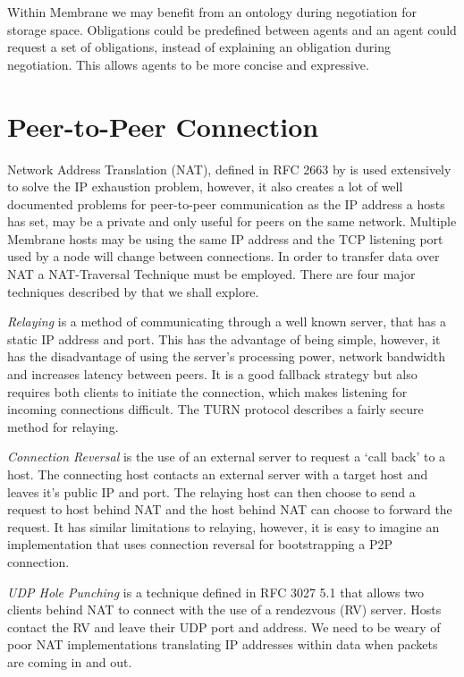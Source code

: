 \documentclass[11pt, a4paper, twocolumn, twoside]{report}
\begin{document}
Within Membrane we may benefit from an ontology during negotiation for storage space. Obligations could be predefined between agents and an agent could request a set of obligations, instead of explaining an obligation during negotiation. This allows agents to be more concise and expressive.

\section{Peer-to-Peer Connection} \label{sec:p2pconn}

Network Address Translation (NAT), defined in RFC 2663 by \cite{srisuresh1999ip} is used extensively to solve the IP exhaustion problem, however, it also creates a lot of well documented problems for peer-to-peer communication as the IP address a hosts has set, may be a private and only useful for peers on the same network. Multiple Membrane hosts may be using the same IP address and the TCP listening port used by a node will change between connections. In order to transfer data over NAT a NAT-Traversal Technique must be employed. There are four major techniques described by \cite{ford2005peer} that we shall explore.

\emph{Relaying} is a method of communicating through a well known server, that has a static IP address and port. This has the advantage of being simple, however, it has the disadvantage of using the server's processing power, network bandwidth and increases latency between peers. It is a good fallback strategy but also requires both clients to initiate the connection, which makes listening for incoming connections difficult. The TURN protocol \citep{rosenberg2005traversal} describes a fairly secure method for relaying.

\emph{Connection Reversal} is the use of an external server to request a `call back' to a host. The connecting host contacts an external server with a target host and leaves it's public IP and port. The relaying host can then choose to send a request to host behind NAT and the host behind NAT can choose to forward the request. It has similar limitations to relaying, however, it is easy to imagine an implementation that uses connection reversal for bootstrapping a P2P connection.

\emph{UDP Hole Punching} is a technique defined in RFC 3027 5.1 \citep{holdrege2001rfc} that allows two clients behind NAT to connect with the use of a rendezvous (RV) server. Hosts contact the RV and leave their UDP port and address. We need to be weary of poor NAT implementations translating IP addresses within data when packets are coming in and out. \citep{ford2005peer}
\end{document}
